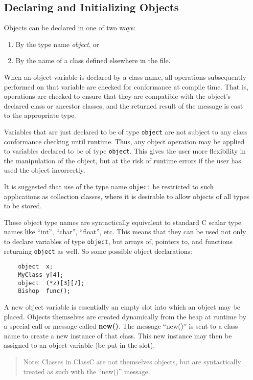 \subsection{Declaring and Initializing Objects}
Objects can be declared in one of two ways:
\begin{enumerate}
\item By the type name {\em object}, or
\item By the name of a class defined elsewhere in the file.
\end{enumerate}
When an object variable is declared by a class name, all operations
subsequently performed on that variable are checked for conformance
at compile time.
That is, operations are checked to ensure that they are compatible with
the object's declared class or ancestor classes, and the returned
result of the message is cast to the appropriate type.

Variables that are just declared to be of type
{\tt object}
are not subject to any class conformance checking until runtime.  Thus, any
object operation may be applied to variables declared to be of type
{\tt object}.
This gives the user more flexibility in the manipulation of the object,
but at the risk of runtime errors if the user has used the object
incorrectly.

It is suggested that use of the type name
{\tt object}
be restricted to such applications as collection classes, where it is desirable to
allow objects of all types to be stored.

These object type names are syntactically equivalent to
standard C scalar type names like ``int'', ``char'', ``float'', etc.
This means that they
can be used not only to declare variables of type
{\tt object},
but arrays of, pointers to, and functions returning
{\tt object}
as well.  So some possible object declarations:
\begin{verbatim}
	object	x;
	MyClass	y[4];
	object	(*z)[3][7];
	Bishop	func();

\end{verbatim}

A new object variable is essentially an empty slot into which an object
may be placed.  Objects themselves are created dynamically from the heap
at runtime by a special call or message called {\bf new()}.  The message
``new()''
is sent to a class name to create a new instance of that class.  This new
instance may then be assigned to an object variable (be put in the slot).
\begin{quote}
Note: Classes in ClassC are not themselves objects, but are syntactically
treated as such with the ``new()'' message.
\end{quote}

